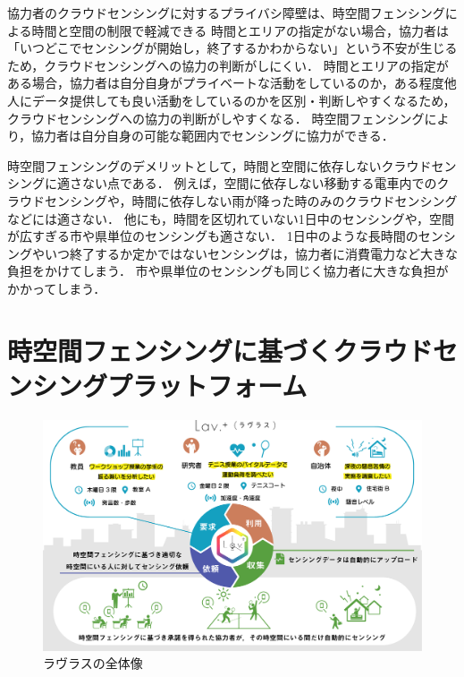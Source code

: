 協力者のクラウドセンシングに対するプライバシ障壁は、時空間フェンシングによる時間と空間の制限で軽減できる
時間とエリアの指定がない場合，協力者は「いつどこでセンシングが開始し，終了するかわからない」という不安が生じるため，クラウドセンシングへの協力の判断がしにくい．
時間とエリアの指定がある場合，協力者は自分自身がプライベートな活動をしているのか，ある程度他人にデータ提供しても良い活動をしているのかを区別・判断しやすくなるため，クラウドセンシングへの協力の判断がしやすくなる．
時空間フェンシングにより，協力者は自分自身の可能な範囲内でセンシングに協力ができる．

時空間フェンシングのデメリットとして，時間と空間に依存しないクラウドセンシングに適さない点である．
例えば，空間に依存しない移動する電車内でのクラウドセンシングや，時間に依存しない雨が降った時のみのクラウドセンシングなどには適さない．
他にも，時間を区切れていない1日中のセンシングや，空間が広すぎる市や県単位のセンシングも適さない．
1日中のような長時間のセンシングやいつ終了するか定かではないセンシングは，協力者に消費電力など大きな負担をかけてしまう．
市や県単位のセンシングも同じく協力者に大きな負担がかかってしまう．

\section{時空間フェンシングに基づくクラウドセンシングプラットフォーム}

\begin{figure}[tbh]
    \centering
    \includegraphics[width=16cm]{img_lavlus.png}
    \caption{ラヴラスの全体像}
    \label{fig:lavlus}
\end{figure}

